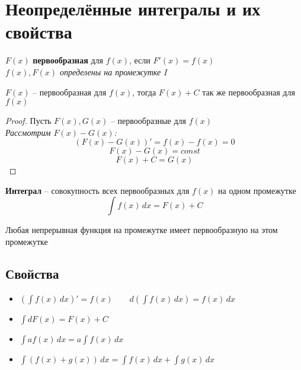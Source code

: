 \section{Неопределённые интегралы и их свойства}

\begin{definition}
$F(x)$ \textbf{первообразная} для $f(x)$, если $F'(x) = f(x)$ \\
\textit{$f(x), F(x)$ определены на промежутке $I$}
\end{definition}

\begin{theorem}
$F(x)$ --  первообразная для $f(x)$, тогда $F(x) + C$ так же первообразная для $f(x)$
\end{theorem}
\begin{proof}
Пусть $F(x), G(x)$ -- первообразные для $f(x)$ \\
\textit{Рассмотрим $F(x) - G(x)$:}
$$(F(x)- G(x))' = f(x) - f(x) = 0$$
$$F(x) - G(x) = const$$
$$F(x) + C = G(x)$$
\end{proof}

\begin{definition}
\textbf{Интеграл} -- совокупность всех первообразных для $f(x)$ на одном промежутке
$$\int f(x)\,dx = F(x) + C$$
\end{definition}

\begin{note}
Любая непрерывная функция на промежутке имеет первообразную на этом промежутке
\end{note}

\subsection{Свойства}

\begin{itemize}
  \item $\left(\displaystyle\int f(x)\,dx\right)' = f(x) \qquad d\left(\displaystyle\int f(x)\,dx\right) = f(x)\,dx$
  \item $\displaystyle\int dF(x) = F(x) + C$
  \item $\displaystyle\int af(x)\,dx = a\int f(x)\,dx$
  \item $\displaystyle\int (f(x) + g(x))\,dx = \int f(x)\,dx + \int g(x)\,dx$
\end{itemize}
